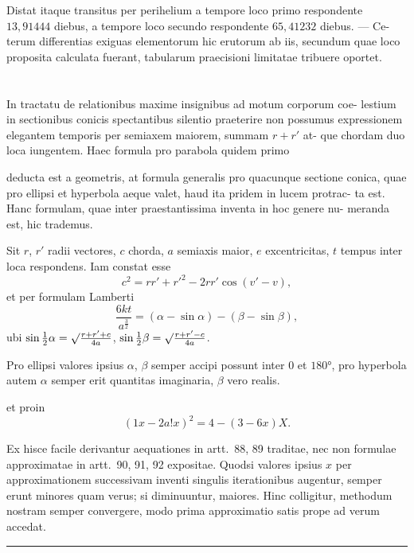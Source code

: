 \documentclass[12pt,a4paper]{article}
\begin{document}
Distat itaque transitus per perihelium a tempore loco primo respondente
$13{,}91444$ diebus, a tempore loco secundo respondente $65{,}41232$ diebus. --- Ce-
terum differentias exiguas elementorum hic erutorum ab iis, secundum quae
loco proposita calculata fuerant, tabularum praecisioni limitatae tribuere oportet.

\section{}

In tractatu de relationibus maxime insignibus ad motum corporum coe-
lestium in sectionibus conicis spectantibus silentio praeterire non possumus
expressionem elegantem temporis per semiaxem maiorem, summam $r + r'$ at-
que chordam duo loca iungentem. Haec formula pro parabola quidem primo

deducta est a geometris, at formula generalis pro quacunque sectione conica,
quae pro ellipsi et hyperbola aeque valet, haud ita pridem in lucem protrac-
ta est. Hanc formulam, quae inter praestantissima inventa in hoc genere nu-
meranda est, hic trademus.

Sit $r$, $r'$ radii vectores, $c$ chorda, $a$ semiaxis maior, $e$ excentricitas, $t$
tempus inter loca respondens. Iam constat esse
\[
c^2 = rr' + r'^2 - 2rr'\cos(v' - v),
\]
et per formulam Lamberti
\[
\frac{6kt}{a^{\frac{3}{2}}} = (\alpha - \sin\alpha) - (\beta - \sin\beta),
\]
ubi $\sin\tfrac{1}{2}\alpha = \surd\frac{r + r' + c}{4a}$, $\sin\tfrac{1}{2}\beta = \surd\frac{r + r' - c}{4a}$.

Pro ellipsi valores ipsius $\alpha$, $\beta$ semper accipi possunt inter $0$ et $180°$,
pro hyperbola autem $\alpha$ semper erit quantitas imaginaria, $\beta$ vero realis.

et proin
\begin{equation}
(1x - 2a!x)^2 = 4 - (3 - 6x)X.
\end{equation}

Ex hisce facile derivantur aequationes in artt.~88, 89 traditae, nec non
formulae approximatae in artt.~90, 91, 92 expositae. Quodsi valores ipsius
$x$ per approximationem successivam inventi singulis iterationibus augentur,
semper erunt minores quam verus; si diminuuntur, maiores. Hinc colligitur,
methodum nostram semper convergere, modo prima approximatio satis prope
ad verum accedat.

\vspace{2em}
\begin{center}
\rule{0.5\textwidth}{0.4pt}
\end{center}
\end{document}
